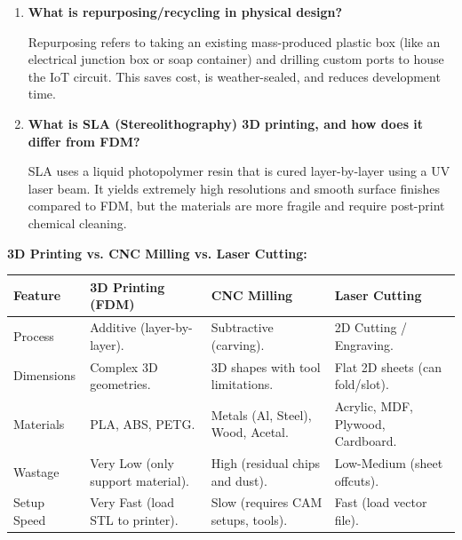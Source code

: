 \documentclass[12pt,a4paper]{article}
\newcommand{\Q}[1]{\textbf{#1}\par\noindent\ignorespaces}
\renewcommand{\arraystretch}{1.45}
\begin{document}
\begin{tcolorbox}[exambox, title={\textbf{Frequently Asked / Viva Questions}}]
\begin{enumerate}[leftmargin=*, topsep=0pt, label=\textbf{Q\arabic*.}, itemsep=6pt]
  \item \Q{What is repurposing/recycling in physical design?}
        Repurposing refers to taking an existing mass-produced plastic box (like an electrical junction box or soap container) and drilling custom ports to house the IoT circuit. This saves cost, is weather-sealed, and reduces development time.
        
  \item \Q{What is SLA (Stereolithography) 3D printing, and how does it differ from FDM?}
        SLA uses a liquid photopolymer resin that is cured layer-by-layer using a UV laser beam. It yields extremely high resolutions and smooth surface finishes compared to FDM, but the materials are more fragile and require post-print chemical cleaning.
\end{enumerate}
\end{tcolorbox}

\vspace{6pt}

\begin{tcolorbox}[tikzbox, title={\textbf{Comparison Snapshot}}]
\textbf{3D Printing vs. CNC Milling vs. Laser Cutting:}\par\vspace{6pt}\noindent
{\renewcommand{\arraystretch}{1.35}%
\begin{tabularx}{\linewidth}{|B{3.2cm}|Y|Y|Y|}
\hline
\textbf{Feature} & \textbf{3D Printing (FDM)} & \textbf{CNC Milling} & \textbf{Laser Cutting} \\
\hline
Process & Additive (layer-by-layer). & Subtractive (carving). & 2D Cutting / Engraving. \\
\hline
Dimensions & Complex 3D geometries. & 3D shapes with tool limitations. & Flat 2D sheets (can fold/slot). \\
\hline
Materials & PLA, ABS, PETG. & Metals (Al, Steel), Wood, Acetal. & Acrylic, MDF, Plywood, Cardboard. \\
\hline
Wastage & Very Low (only support material). & High (residual chips and dust). & Low-Medium (sheet offcuts). \\
\hline
Setup Speed & Very Fast (load STL to printer). & Slow (requires CAM setups, tools). & Fast (load vector file). \\
\hline
\end{tabularx}}
\end{tcolorbox}
\end{document}
